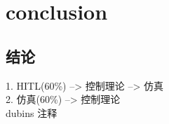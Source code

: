     \chapter{conclusion}
    
    \section{结论}

    1. HITL(60\%) --> 控制理论 --> 仿真 \\
    2. 仿真(60\%) --> 控制理论 \\
    dubins 注释